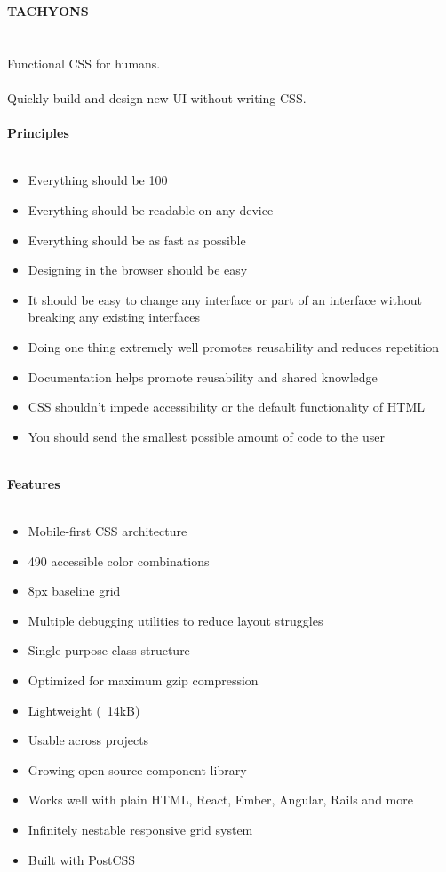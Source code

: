 \documentclass{article}
\begin{document}
{\noindent \Huge \textbf{TACHYONS}}\\\\
\\
Functional CSS for humans.\\
\\
Quickly build and design new UI without writing CSS.\\
\\
{\noindent \LARGE \textbf{Principles}}\\\\
\begin{itemize}
	\item Everything should be 100%
	\item Everything should be readable on any device
	\item Everything should be as fast as possible
	\item Designing in the browser should be easy
	\item It should be easy to change any interface or part of an interface without breaking any existing interfaces
	\item Doing one thing extremely well promotes reusability and reduces repetition
	\item Documentation helps promote reusability and shared knowledge
	\item CSS shouldn't impede accessibility or the default functionality of HTML
	\item You should send the smallest possible amount of code to the user
\end{itemize}
\\
{\noindent \LARGE \textbf{Features}}\\\\
\begin{itemize}
	\item Mobile-first CSS architecture
	\item 490 accessible color combinations
	\item 8px baseline grid
	\item Multiple debugging utilities to reduce layout struggles
	\item Single-purpose class structure
	\item Optimized for maximum gzip compression
	\item Lightweight (~14kB)
	\item Usable across projects
	\item Growing open source component library
	\item Works well with plain HTML, React, Ember, Angular, Rails and more
	\item Infinitely nestable responsive grid system
	\item Built with PostCSS
\end{itemize}
\end{document}
